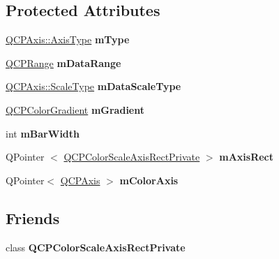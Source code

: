 \subsection*{\-Protected \-Attributes}
\begin{DoxyCompactItemize}
\item 
\hypertarget{classQCPColorScale_a7d47ed4ab76f38e50164e9d77fe33789}{\hyperlink{classQCPAxis_ae2bcc1728b382f10f064612b368bc18a}{\-Q\-C\-P\-Axis\-::\-Axis\-Type} {\bfseries m\-Type}}\label{classQCPColorScale_a7d47ed4ab76f38e50164e9d77fe33789}

\item 
\hypertarget{classQCPColorScale_a5d4853feb32cd0077bb2b871687c844b}{\hyperlink{classQCPRange}{\-Q\-C\-P\-Range} {\bfseries m\-Data\-Range}}\label{classQCPColorScale_a5d4853feb32cd0077bb2b871687c844b}

\item 
\hypertarget{classQCPColorScale_a2754d6a78736f64a241e333fbd955372}{\hyperlink{classQCPAxis_a36d8e8658dbaa179bf2aeb973db2d6f0}{\-Q\-C\-P\-Axis\-::\-Scale\-Type} {\bfseries m\-Data\-Scale\-Type}}\label{classQCPColorScale_a2754d6a78736f64a241e333fbd955372}

\item 
\hypertarget{classQCPColorScale_ae195a385032066b5c46cc3301af58922}{\hyperlink{classQCPColorGradient}{\-Q\-C\-P\-Color\-Gradient} {\bfseries m\-Gradient}}\label{classQCPColorScale_ae195a385032066b5c46cc3301af58922}

\item 
\hypertarget{classQCPColorScale_a409d2ab78dff1f92da5e6acfb062e811}{int {\bfseries m\-Bar\-Width}}\label{classQCPColorScale_a409d2ab78dff1f92da5e6acfb062e811}

\item 
\hypertarget{classQCPColorScale_a6e37f7d49cd614dc50ef1caae60461b9}{\-Q\-Pointer\*
$<$ \hyperlink{classQCPColorScaleAxisRectPrivate}{\-Q\-C\-P\-Color\-Scale\-Axis\-Rect\-Private} $>$ {\bfseries m\-Axis\-Rect}}\label{classQCPColorScale_a6e37f7d49cd614dc50ef1caae60461b9}

\item 
\hypertarget{classQCPColorScale_a2efbc90fd31898fe05d2b74a8422b1d5}{\-Q\-Pointer$<$ \hyperlink{classQCPAxis}{\-Q\-C\-P\-Axis} $>$ {\bfseries m\-Color\-Axis}}\label{classQCPColorScale_a2efbc90fd31898fe05d2b74a8422b1d5}

\end{DoxyCompactItemize}
\subsection*{\-Friends}
\begin{DoxyCompactItemize}
\item 
\hypertarget{classQCPColorScale_a1441d8c09d7227c0c29a8d0a96d55bfe}{class {\bfseries \-Q\-C\-P\-Color\-Scale\-Axis\-Rect\-Private}}\label{classQCPColorScale_a1441d8c09d7227c0c29a8d0a96d55bfe}

\end{DoxyCompactItemize}


